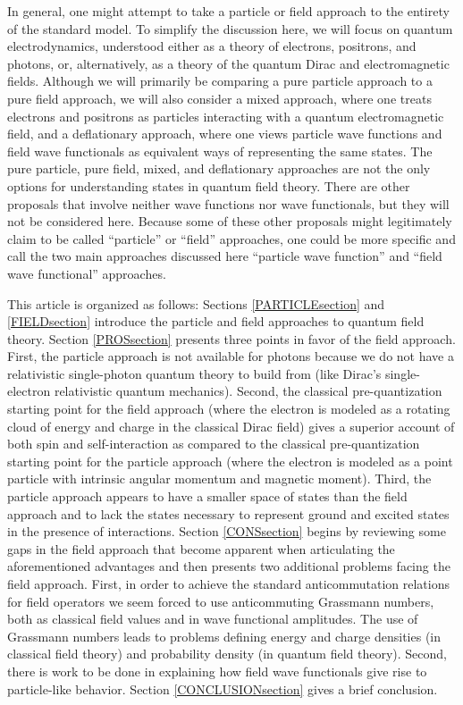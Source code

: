 \documentclass[12pt,onecolumn,secnumarabic,amsmath,amssymb,balancelastpage,nofootinbib]{article}
\begin{document}
In general, one might attempt to take a particle or field approach to the entirety of the standard model.  To simplify the discussion here, we will focus on quantum electrodynamics, understood either as a theory of electrons, positrons, and photons, or, alternatively, as a theory of the quantum Dirac and electromagnetic fields.  Although we will primarily be comparing a pure particle approach to a pure field approach, we will also consider a mixed approach, where one treats electrons and positrons as particles interacting with a quantum electromagnetic field, and a deflationary approach, where one views particle wave functions and field wave functionals as equivalent ways of representing the same states.  The pure particle, pure field, mixed, and deflationary approaches are not the only options for understanding states in quantum field theory.  There are other proposals that involve neither wave functions nor wave functionals, but they will not be considered here.  Because some of these other proposals might legitimately claim to be called ``particle'' or ``field'' approaches, one could be more specific and call the two main approaches discussed here ``particle wave function'' and ``field wave functional'' approaches.

This article is organized as follows:  Sections \ref{PARTICLEsection} and \ref{FIELDsection} introduce the particle and field approaches to quantum field theory.  Section \ref{PROSsection} presents three points in favor of the field approach.  First, the particle approach is not available for photons because we do not have a relativistic single-photon quantum theory to build from (like Dirac's single-electron relativistic quantum mechanics).  Second, the classical pre-quantization starting point for the field approach (where the electron is modeled as a rotating cloud of energy and charge in the classical Dirac field) gives a superior account of both spin and self-interaction as compared to the classical pre-quantization starting point for the particle approach (where the electron is modeled as a point particle with intrinsic angular momentum and magnetic moment).  Third, the particle approach appears to have a smaller space of states than the field approach and to lack the states necessary to represent ground and excited states in the presence of interactions.  Section \ref{CONSsection} begins by reviewing some gaps in the field approach that become apparent when articulating the aforementioned advantages and then presents two additional problems facing the field approach.  First, in order to achieve the standard anticommutation relations for field operators we seem forced to use anticommuting Grassmann numbers, both as classical field values and in wave functional amplitudes.  The use of Grassmann numbers leads to problems defining energy and charge densities (in classical field theory) and probability density (in quantum field theory).  Second, there is work to be done in explaining how field wave functionals give rise to particle-like behavior. Section \ref{CONCLUSIONsection} gives a brief conclusion.
\end{document}
